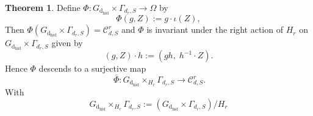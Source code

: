 \documentclass{article}
\newcommand{\dhid}{\operatorname{d_{hid}}}
\theoremstyle{definition}
\newtheorem{theorem}{Theorem}[section]
\begin{document}
\begin{theorem}\label{prop:parameters-as-bundle}
    Define $\Phi \colon G_{\dhid} \times \Gamma_{d_r,S} \to \Omega$ by
\begin{equation}
\Phi(g, Z) := g \cdot \iota(Z),
\end{equation}
Then $\Phi(G_{\dhid} \times \Gamma_{d_r,S}) = \mathcal{C}^r_{d,S}$ and $\Phi$ is invariant under the right action of $H_{r}$ on $G_{\dhid}   \times \Gamma_{d_r,S}$ given by
\begin{equation}
(g, Z) \cdot h := (g h,\; h^{-1} \cdot Z).
\end{equation}
Hence $\Phi$ descends to a surjective map
\[\
\bar\Phi \colon G_{\dhid} \times_{H_{r}} \Gamma_{d_r,S} \longrightarrow \mathcal{C}^r_{d,S}.
\]
With 
\begin{equation*}
     G_{\dhid} \times_{H_{r}} \Gamma_{d_r,S} := (G_{\dhid} \times \Gamma_{d_r,S}) / H_{r}
\end{equation*}
\end{theorem}
\end{document}
